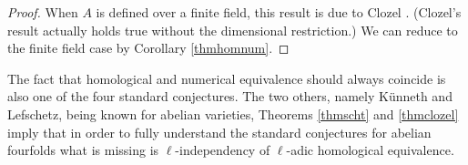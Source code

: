 \begin{proof}
When $A$ is defined over a finite field, this result is due to Clozel \cite{Clozel}. (Clozel's result actually holds true without the dimensional restriction.) We can reduce to the finite field case by Corollary \ref{thmhomnum}.
\end{proof}
\begin{remark}
\notready
The fact that homological and numerical equivalence should always coincide is also one of the four standard conjectures. The two others, namely K\"unneth and Lefschetz, being known for abelian varieties, Theorems \ref{thmscht} and \ref{thmclozel} imply that in order to fully understand the standard conjectures for abelian fourfolds what is missing is $\ell$-independency of $\ell$-adic homological equivalence.
\end{remark}
